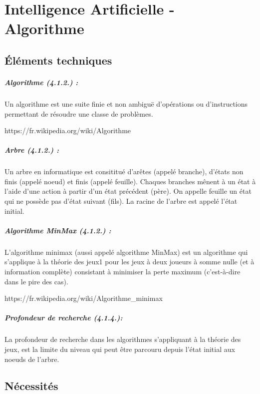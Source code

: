 \chapter{Intelligence Artificielle - Algorithme}

	\section{Éléments techniques}
	
\paragraph{Algorithme (4.1.2.) :}
Un algorithme est une suite finie et non ambiguë d’opérations 
ou d'instructions permettant de résoudre une classe de problèmes.

https://fr.wikipedia.org/wiki/Algorithme

\paragraph{Arbre (4.1.2.) :}
Un arbre en informatique est consititué d'arêtes (appelé branche),
d'états non finis (appelé noeud) et finis (appelé feuille). Chaques
branches mênent à un état à l'aide d'une action à partir d'un état
précédent (père). On appelle feuille un état qui ne possède pas d'état 
suivant (fils). La racine de l'arbre est appelé l'état initial.

\paragraph{Algorithme MinMax (4.1.2.) :}
L'algorithme minimax (aussi appelé algorithme MinMax) est un 
algorithme qui s'applique à la théorie des jeux1 pour les jeux à 
deux joueurs à somme nulle (et à information complète) consistant à
minimiser la perte maximum (c'est-à-dire dans le pire des cas).

https://fr.wikipedia.org/wiki/Algorithme\_minimax

\paragraph{Profondeur de recherche (4.1.4.):}
La profondeur de recherche dans les algorithmes s'appliquant à la
théorie des jeux, est la limite du niveau qui peut être parcouru
depuis l'état initial aux noeuds de l'arbre.

			
	\section{Nécessités}
